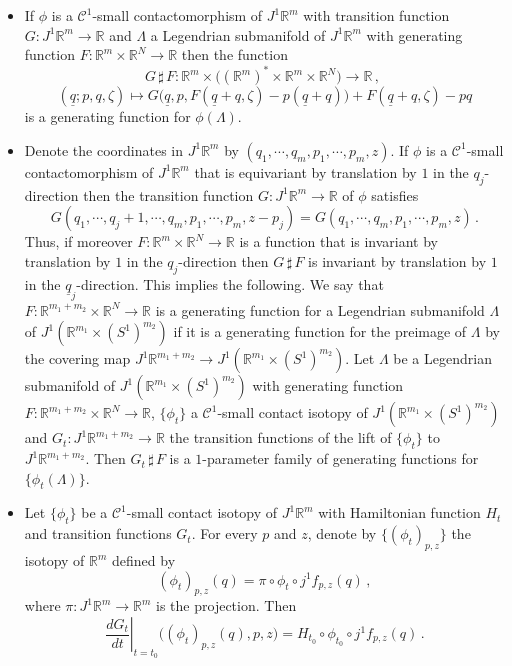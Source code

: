 \documentclass{amsart}
\newcommand{\R}{\mathbb{R}}
\theoremstyle{remark}
\begin{document}
\begin{itemize}

\item If $\phi$ is a $\mathcal{C}^1$-small
contactomorphism of $J^1\mathbb{R}^m$
with transition function $G: J^1\mathbb{R}^m \rightarrow \mathbb{R}$
and $\Lambda$ a Legendrian submanifold of $J^1 \mathbb{R}^m$
with generating function
$F: \mathbb{R}^m \times \mathbb{R}^N \rightarrow \mathbb{R}$
then the function
\[
G \,\sharp\, F:
\mathbb{R}^m \times
\big((\mathbb{R}^{m})^{\ast} \times \mathbb{R}^{m} \times \mathbb{R}^N\big)
\rightarrow \mathbb{R} \,,\;
\]
\[
(\underline{q}; p, q, \zeta) \mapsto
G \big( \underline{q}, p, F (\underline{q} + q, \zeta) - p (\underline{q} + q) \big)
+ F (\underline{q} + q, \zeta) - pq
\]
is a generating function for $\phi (\Lambda)$.

\item Denote the coordinates in $J^1\mathbb{R}^m$
by $(q_1, \cdots, q_m, p_1, \cdots, p_m, z)$.
If $\phi$ is a $\mathcal{C}^1$-small
contactomorphism of $J^1\mathbb{R}^m$
that is equivariant by translation by $1$
in the $q_j$-direction
then the transition function
$G: J^1\mathbb{R}^m \rightarrow \mathbb{R}$ of $\phi$
satisfies
\[
G (q_1, \cdots, q_j + 1, \cdots, q_m, p_1, \cdots, p_m, z - p_j)
= G (q_1, \cdots, q_m, p_1, \cdots, p_m, z) \,.
\]
Thus, if moreover
$F: \mathbb{R}^m \times \mathbb{R}^N \rightarrow \mathbb{R}$
is a function that is invariant by translation by $1$ in the $q_j$-direction
then $G \, \sharp \, F$ is invariant  by translation by $1$
in the $\underline{q}_j$-direction.
This implies the following.
We say that $F: \mathbb{R}^{m_1+m_2} \times \mathbb{R}^N \rightarrow \mathbb{R}$
is a generating function for a Legendrian submanifold $\Lambda$
of $J^1 (\mathbb{R}^{m_1} \times (S^1)^{m_2})$
if it is a generating function
for the preimage of $\Lambda$ by the covering map
$J^1 \mathbb{R}^{m_1 + m_2} \rightarrow J^1 (\mathbb{R}^{m_1} \times (S^1)^{m_2})$.
Let $\Lambda$ be a Legendrian submanifold
of $J^1 (\mathbb{R}^{m_1} \times (S^1)^{m_2})$
with generating function $F: \mathbb{R}^{m_1 + m_2}\times \R^N \rightarrow \mathbb{R}$,
$\{\phi_t\}$ a $\mathcal{C}^1$-small
contact isotopy of $J^1 (\mathbb{R}^{m_1} \times (S^1)^{m_2})$
and $G_t: J^1 \mathbb{R}^{m_1 + m_2} \rightarrow \mathbb{R}$
the transition functions of the lift of $\{\phi_t\}$
to $J^1 \mathbb{R}^{m_1 + m_2}$.
Then $G_t \,\sharp\, F$ is a $1$-parameter family
of generating functions for $\{\phi_t(\Lambda)\}$.

\item Let $\{\phi_t\}$ be a $\mathcal{C}^1$-small contact isotopy of $J^1\mathbb{R}^m$
with Hamiltonian function $H_t$ and transition functions $G_t$.
For every $p$ and $z$,
denote by $\{ (\phi_t)_{p,z} \}$ the isotopy of $\mathbb{R}^m$
defined by
\[
(\phi_t)_{p,z} (q) = \pi \circ \phi_t \circ j^1f_{p,z} (q) \,,
\]
where $\pi: J^1\mathbb{R}^m \rightarrow \mathbb{R}^m$
is the projection.
Then
\[
\left. \frac{dG_t}{dt} \right\lvert_{t = t_0} \big( (\phi_t)_{p,z} (q) , p, z \big)
= H_{t_0} \circ \phi_{t_0} \circ j^1f_{p,z} (q) \,.
\]


\end{itemize}
\end{document}
